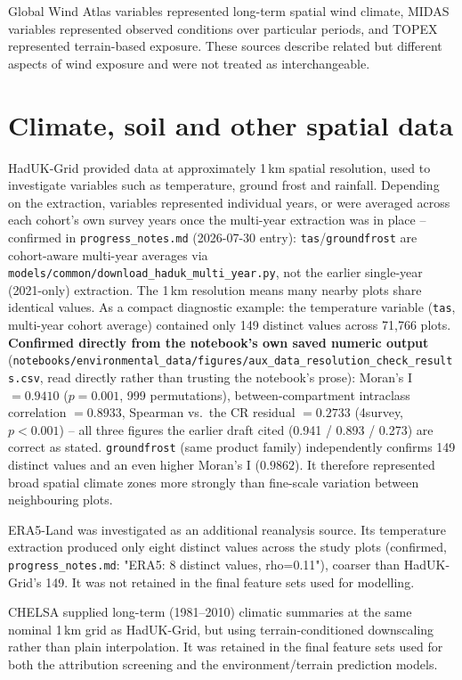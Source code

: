 Global Wind Atlas variables represented long-term spatial wind climate, MIDAS variables represented observed conditions over particular periods, and TOPEX represented terrain-based exposure.
These sources describe related but different aspects of wind exposure and were not treated as interchangeable.

\section{Climate, soil and other spatial data}
HadUK-Grid provided data at approximately 1\,km spatial resolution, used to investigate variables such as temperature, ground frost and rainfall.
Depending on the extraction, variables represented individual years, or were averaged across each cohort's own survey years once the multi-year extraction was in place -- confirmed in \texttt{progress\_notes.md} (2026-07-30 entry): \texttt{tas}/\texttt{groundfrost} are cohort-aware multi-year averages via \texttt{models/common/download\_haduk\_multi\_year.py}, not the earlier single-year (2021-only) extraction.
The 1\,km resolution means many nearby plots share identical values.
As a compact diagnostic example: the temperature variable (\texttt{tas}, multi-year cohort average) contained only 149 distinct values across 71,766 plots. \textbf{Confirmed directly from the notebook's own saved numeric output} (\texttt{notebooks/environmental\_data/figures/aux\_data\_resolution\_check\_results.csv}, read directly rather than trusting the notebook's prose): Moran's I $=0.9410$ ($p=0.001$, 999 permutations), between-compartment intraclass correlation $=0.8933$, Spearman vs.\ the CR residual $=0.2733$ (4survey, $p<0.001$) -- all three figures the earlier draft cited (0.941 / 0.893 / 0.273) are correct as stated. \texttt{groundfrost} (same product family) independently confirms 149 distinct values and an even higher Moran's I ($0.9862$).
It therefore represented broad spatial climate zones more strongly than fine-scale variation between neighbouring plots.

ERA5-Land was investigated as an additional reanalysis source.
Its temperature extraction produced only eight distinct values across the study plots (confirmed, \texttt{progress\_notes.md}: "ERA5: 8 distinct values, rho=0.11"), coarser than HadUK-Grid's 149.
It was not retained in the final feature sets used for modelling.

CHELSA supplied long-term (1981--2010) climatic summaries at the same nominal 1\,km grid as HadUK-Grid, but using terrain-conditioned downscaling rather than plain interpolation.
It was retained in the final feature sets used for both the attribution screening and the environment/terrain prediction models.

